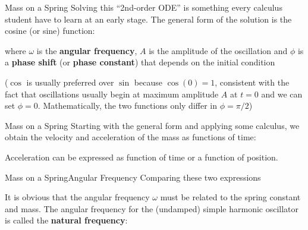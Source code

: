\documentclass[12pt,compress,aspectratio=169]{beamer}
\newcommand{\eq}[2]{\vspace{#1}{\Large\begin{displaymath}#2\end{displaymath}}}
\begin{document}
\begin{frame}{Mass on a Spring}
  Solving this ``2nd-order ODE'' is something  every calculus student have to
  learn at an early stage. The general form of the solution is the cosine
  (or sine) function:

  \eq{-.25in}{
    x(t)=A\cos(\omega t-\phi)
  }

  \vspace{-.1in}where $\omega$ is the \textbf{angular frequency}, $A$ is the
  amplitude of the oscillation and $\phi$ is a \textbf{phase shift} (or
  \textbf{phase constant}) that depends on the initial condition
  
  \vspace{.25in}\footnotesize{
    ($\cos$ is usually preferred over $\sin$ because $\cos(0)=1$,
    consistent with the fact that oscillations usually begin at maximum
    amplitude $A$ at $t=0$ and we can set $\phi=0$. Mathematically, the two
    functions only differ in $\phi=\pi/2$)
  }
\end{frame}


\begin{frame}{Mass on a Spring}
  Starting with the general form and applying some calculus, we obtain the
  velocity and acceleration of the mass as functions of time:
 
  \vspace{-.35in}{\Large
    \begin{align*}
      x(t)&=A\cos(\omega t-\phi)\\
      v(t)&=-A\omega\sin(\omega t-\phi)\\
      a(t)&=-A\omega^2\cos(\omega t-\phi)=-\omega^2x
    \end{align*}
  }

  Acceleration can be expressed as function of time or a function of position.
\end{frame}



\begin{frame}{Mass on a Spring}{Angular Frequency}
  Comparing these two expressions

  \eq{-.2in}{
    a(t)=-\omega^2x(t)\quad\quad -kx(t)=ma(t)
  }
  
  It is obvious that the angular frequency $\omega$ must be related to the
  spring constant and mass. The angular frequency for the (undamped) simple
  harmonic oscillator is called the \textbf{natural frequency}:

  \eq{-.15in}{
    \boxed{\omega=\sqrt{\frac{k}{m}}}
  }
\end{frame}
\end{document}
